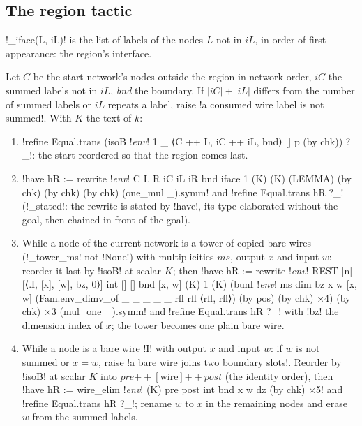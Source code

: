 {\subsection{The region tactic}\label{sec:lean-export-net-region}

\py!_iface(L, iL)! is the list of labels of the nodes $L$ not in $iL$, in order of first
appearance: the region's interface.

\begin{algorithm}\label{alg:lean-export-net-region}
Let $C$ be the start network's nodes outside the region in network order, $iC$ the summed labels
not in $iL$, \textit{bnd} the boundary. If $|iC|+|iL|$ differs from the number of summed labels
or $iL$ repeats a label, raise \code!a consumed wire label is not summed!. With $K$ the text of
$k$:
\begin{enumerate}
\item \code!refine Equal.trans (isoB !\textit{env}\code! 1 _ ⟨C ++ L, iC ++ iL, bnd⟩ [] p (by chk)) ?_!:
  the start reordered so that the region comes last.
\item \code!have hR := rewrite !\textit{env}\code! C L R iC iL iR bnd iface 1 (K) (K) (LEMMA) (by chk) (by chk) (by chk) (one_mul _).symm!
  and \code!refine Equal.trans hR ?_! (\py!_stated!: the rewrite is stated by \lean!have!, its type
  elaborated without the goal, then chained in front of the goal).
\item While a node of the current network is a tower of copied bare wires (\py!_tower_ms! not
  \py!None!) with multiplicities $ms$, output $x$ and input $w$: reorder it last by
  \lean!isoB! at scalar $K$; then
  \code!have hR := rewrite !\textit{env}\code! REST [n] [⟨.I, [x], [w], bz, 0⟩] int [] [] bnd [x, w] (K) 1 (K) (bunI !\textit{env}\code! ms dim bz x w [x, w] (Fam.env_dimv_of _ _ _ _ _ rfl rfl ⟨rfl, rfl⟩) (by pos) (by chk) ×4) (by chk) ×3 (mul_one _).symm!
  and \code!refine Equal.trans hR ?_!
  with \code!bz! the dimension index of $x$; the tower becomes one plain bare wire.
\item While a node is a bare wire \code!I! with output $x$ and input $w$: if $w$ is not summed or
  $x = w$, raise \code!a bare wire joins two boundary slots!. Reorder by \lean!isoB! at scalar $K$
  into $\textit{pre} \mathbin{+\!\!+} [\text{wire}] \mathbin{+\!\!+} \textit{post}$ (the identity
  order), then
  \code!have hR := wire_elim !\textit{env}\code! (K) pre post int bnd x w dz (by chk) ×5! and
  \code!refine Equal.trans hR ?_!;
  rename $w$ to $x$ in the remaining nodes and erase $w$ from the summed labels.

\end{enumerate}
\end{algorithm}}
